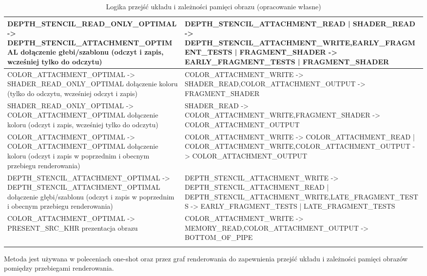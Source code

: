 \begin{center}
\begin{longtable}{ |>{\RaggedRight}p{7cm}||>{\RaggedRight}p{7cm}|}
		\hline
		\mbox{DEPTH\_STENCIL\_READ\_ONLY\_OPTIMAL} -> \mbox{DEPTH\_STENCIL\_ATTACHMENT\_OPTIMAL} \newline dołączenie głebi/szablonu (odczyt i zapis, wcześniej tylko do odczytu) & \mbox{DEPTH\_STENCIL\_ATTACHMENT\_READ} | \mbox{SHADER\_READ} -> \mbox{DEPTH\_STENCIL\_ATTACHMENT\_WRITE},\newline \mbox{EARLY\_FRAGMENT\_TESTS} | \mbox{FRAGMENT\_SHADER} -> \mbox{EARLY\_FRAGMENT\_TESTS} | \mbox{FRAGMENT\_SHADER} \\
		\hline
		\mbox{COLOR\_ATTACHMENT\_OPTIMAL} -> \mbox{SHADER\_READ\_ONLY\_OPTIMAL} \newline dołączenie koloru (tylko do odczytu, wcześniej odczyt i zapis) & \mbox{COLOR\_ATTACHMENT\_WRITE} -> \mbox{SHADER\_READ},\newline  \mbox{COLOR\_ATTACHMENT\_OUTPUT} -> \mbox{FRAGMENT\_SHADER} \\
		\hline
		\mbox{SHADER\_READ\_ONLY\_OPTIMAL} -> \mbox{COLOR\_ATTACHMENT\_OPTIMAL} \newline dołączenie koloru (odczyt i zapis, wcześniej tylko do odczytu) & \mbox{SHADER\_READ} -> \mbox{COLOR\_ATTACHMENT\_WRITE},\newline  \mbox{FRAGMENT\_SHADER} -> \mbox{COLOR\_ATTACHMENT\_OUTPUT} \\
		\hline
		\mbox{COLOR\_ATTACHMENT\_OPTIMAL} -> \mbox{COLOR\_ATTACHMENT\_OPTIMAL} \newline dołączenie koloru (odczyt i zapis w poprzednim i obecnym przebiegu renderowania) & \mbox{COLOR\_ATTACHMENT\_WRITE} -> \mbox{COLOR\_ATTACHMENT\_READ} | \mbox{COLOR\_ATTACHMENT\_WRITE},\newline  \mbox{COLOR\_ATTACHMENT\_OUTPUT} -> \mbox{COLOR\_ATTACHMENT\_OUTPUT} \\
		\hline
		\mbox{DEPTH\_STENCIL\_ATTACHMENT\_OPTIMAL} -> \mbox{DEPTH\_STENCIL\_ATTACHMENT\_OPTIMAL} \newline dołączenie głębi/szablonu (odczyt i zapis w poprzednim i obecnym przebiegu renderowania) & \mbox{DEPTH\_STENCIL\_ATTACHMENT\_WRITE} -> \mbox{DEPTH\_STENCIL\_ATTACHMENT\_READ} | \mbox{DEPTH\_STENCIL\_ATTACHMENT\_WRITE},\newline  \mbox{LATE\_FRAGMENT\_TESTS} -> \mbox{EARLY\_FRAGMENT\_TESTS} | \mbox{LATE\_FRAGMENT\_TESTS} \\
		\hline
		\mbox{COLOR\_ATTACHMENT\_OPTIMAL} -> \mbox{PRESENT\_SRC\_KHR} \newline prezentacja obrazu & \mbox{COLOR\_ATTACHMENT\_WRITE} -> \mbox{MEMORY\_READ},\newline  \mbox{COLOR\_ATTACHMENT\_OUTPUT} -> \mbox{BOTTOM\_OF\_PIPE} \\
		\hline
		
	\caption{Logika przejść układu i zależności pamięci obrazu (opracowanie własne)} 
	\label{transition_logic}
	\end{longtable}
\end{center}
Metoda jest używana w poleceniach one-shot oraz przez graf renderowania do zapewnienia przejść układu i zależności pamięci obrazów pomiędzy przebiegami renderowania.


